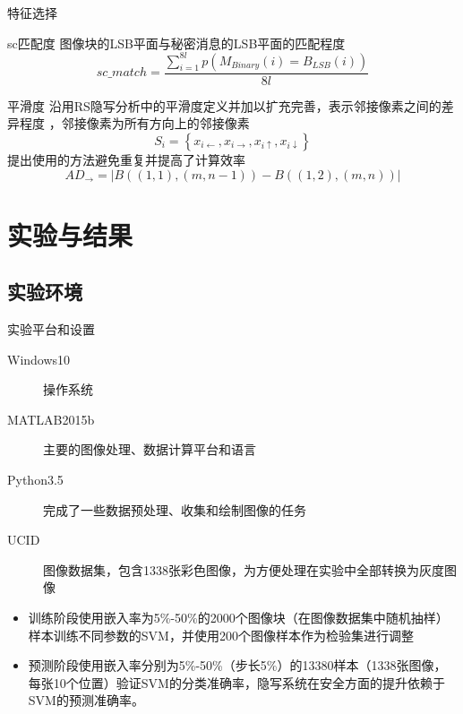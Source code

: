 \documentclass[14pt]{Bredelebeamer}
\begin{document}
\begin{frame}{特征选择}
	\begin{block}{sc匹配度}
	图像块的LSB平面与秘密消息的LSB平面的匹配程度
	$$sc\_match = \frac{{\sum\limits_{i = 1}^{8l} {p\left( {{M_{Binary}}\left( i \right) = {B_{LSB}}\left( i \right)} \right)} }}{{8l}}$$
	\end{block}

	\begin{exampleblock}{平滑度}
		沿用RS隐写分析中的平滑度定义并加以扩充完善，表示邻接像素之间的差异程度
	，邻接像素为所有方向上的邻接像素
	$${S_i} = \left\{ {x_{i \leftarrow}},{x_{i \to }},{x_{i \uparrow }},{x_{i \downarrow}}\right\}$$
	提出使用的方法避免重复并提高了计算效率
	$$A{D_ \to } = \left| {B\left( {\left( {1,1} \right),\left( {m,n - 1} \right)} \right) - B\left( {\left( {1,2} \right),\left( {m,n} \right)} \right)} \right|$$
	\end{exampleblock}
\end{frame}




\section{实验与结果}
\subsection{实验环境}
\begin{frame}{实验平台和设置}
	\begin{description}
		\item[Windows10] 操作系统
		\item[MATLAB2015b] 主要的图像处理、数据计算平台和语言
		\item[Python3.5] 完成了一些数据预处理、收集和绘制图像的任务
		\item[UCID] 图像数据集，包含1338张彩色图像，为方便处理在实验中全部转换为灰度图像
	\end{description}
	\begin{block}{}
		\begin{itemize}
			\item 训练阶段使用嵌入率为5\%-50\%的2000个图像块（在图像数据集中随机抽样）样本训练不同参数的SVM，并使用200个图像样本作为检验集进行调整
			\item
			预测阶段使用嵌入率分别为5\%-50\%（步长5\%）的13380样本（1338张图像，每张10个位置）验证SVM的分类准确率，隐写系统在安全方面的提升依赖于SVM的预测准确率。
		\end{itemize}
	\end{block}
\end{frame}
\end{document}
